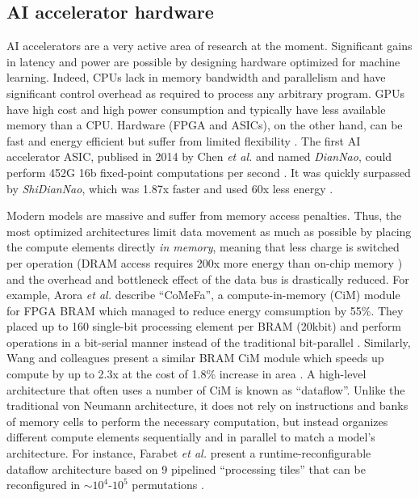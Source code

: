 \documentclass[12pt, hidelinks]{article}
\begin{document}
    \subsection{AI accelerator hardware}
    AI accelerators are a very active area of research at the moment. Significant gains in latency and power are possible by designing hardware optimized for machine learning. Indeed, CPUs lack in memory bandwidth and parallelism and have significant control overhead
    as required to process any arbitrary program. GPUs have high cost and high power consumption and typically have less available memory than a CPU. Hardware (FPGA and ASICs), on the other hand, can be fast and energy efficient but suffer from limited flexibility \cite{hu2022survey}.
    The first AI accelerator ASIC, publised in 2014 by Chen \textit{et al.} and named \textit{DianNao}, could perform 452G 16b fixed-point computations per second \cite{chen2014diannao}. It was quickly surpassed by \textit{ShiDianNao}, which was 1.87x faster and used 60x less
    energy \cite{du2015shidiannao}.

    Modern models are massive and suffer from memory access penalties. Thus, the most optimized architectures limit data movement as much as possible by placing the compute elements directly \textit{in memory}, meaning that less charge is switched per operation
    (DRAM access requires 200x more energy than on-chip memory \cite*{ding2017circnn}) and the overhead and bottleneck effect of the data bus is drastically reduced. For example, Arora \textit{et al.} describe ``CoMeFa'', a compute-in-memory (CiM) module
    for FPGA BRAM which managed to reduce energy comsumption by 55\%. They placed up to 160 single-bit processing element per BRAM (20kbit) and perform operations in a bit-serial manner instead of the traditional bit-parallel \cite*{arora2022comefa}. Similarly, 
    Wang and colleagues present a similar BRAM CiM module which speeds up compute by up to 2.3x at the cost of 1.8\% increase in area \cite*{wang2021compute}. A high-level architecture that often uses a number of CiM is known as ``dataflow''. Unlike the traditional
    von Neumann architecture, it does not rely on instructions and banks of memory cells to perform the necessary computation, but instead organizes different compute elements sequentially and in parallel to match a model's architecture. For instance, Farabet 
    \textit{et al.} present a runtime-reconfigurable dataflow architecture based on 9 pipelined ``processing tiles'' that can be reconfigured in $\sim$$10^4$-$10^5$ permutations \cite{farabetlargescale}.
    
\end{document}
